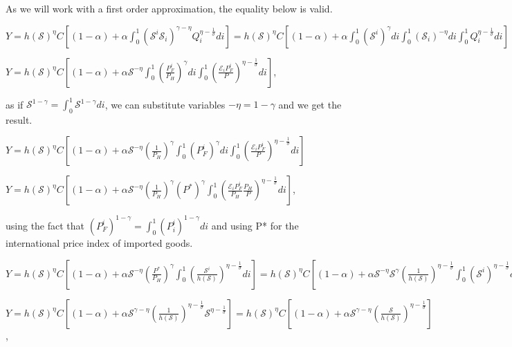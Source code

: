 \documentclass[
]{article}
\begin{document}
As we will work with a first order approximation, the equality below is
valid.

\(\displaystyle Y = h(\mathcal{S})^{\eta}C \left[ (1-\alpha) + \alpha \int_0^1 \left( \mathcal{S}^i \mathcal{S}_i \right)^{\gamma-\eta} Q_i^{\eta-\frac{1}{\sigma}} di \right] = h(\mathcal{S})^{\eta}C \left[ (1-\alpha) + \alpha \int_0^1 ( \mathcal{S}^i)^{\gamma} di \int_0^1 ( \mathcal{S}_i)^{-\eta} di \int_0^1 Q_i^{\eta-\frac{1}{\sigma}} di \right]\)

\(\displaystyle Y = h(\mathcal{S})^{\eta}C \left[ (1-\alpha) + \alpha \mathcal{S}^{-\eta} \int_0^1 \left( \frac{P_F^i}{P_H} \right)^{\gamma} di \int_0^1 \left( \frac{\mathcal{E}_i P_F^i}{P} \right)^{\eta-\frac{1}{\sigma}} di \right]\),

as if
\(\displaystyle \mathcal{S}^{1-\gamma}=\int_0^1 \mathcal{S}^{1-\gamma}di\),
we can substitute variables \(-\eta=1-\gamma\) and we get the result.

\(\displaystyle Y = h(\mathcal{S})^{\eta}C \left[ (1-\alpha) + \alpha \mathcal{S}^{-\eta} \left( \frac{1}{P_H} \right)^{\gamma} \int_0^1 \left( P_F^i \right)^{\gamma} di \int_0^1 \left( \frac{\mathcal{E}_i P_F^i}{P} \right)^{\eta-\frac{1}{\sigma}} di \right]\)

\(\displaystyle Y= h(\mathcal{S})^{\eta}C \left[ (1-\alpha) + \alpha \mathcal{S}^{-\eta} \left( \frac{1}{P_H} \right)^{\gamma} (P^*)^{\gamma} \int_0^1 \left( \frac{\mathcal{E}_i P_F^i}{P_H} \frac{P_H}{P} \right)^{\eta-\frac{1}{\sigma}} di \right]\),

using the fact that
\(\left( P_F^i \right)^{1-\gamma} = \displaystyle \int_0^1 \left( P_i^i \right)^{1-\gamma}di\)
and using P* for the international price index of imported goods.

\(\displaystyle Y = h(\mathcal{S})^{\eta}C \left[ (1-\alpha) + \alpha \mathcal{S}^{-\eta} \left( \frac{P^*}{P_H} \right)^{\gamma} \int_0^1 \left( \frac{\mathcal{S}^i}{h(\mathcal{S})} \right)^{\eta-\frac{1}{\sigma}} di \right] =h(\mathcal{S})^{\eta}C \left[ (1-\alpha) + \alpha \mathcal{S}^{-\eta} \mathcal{S}^\gamma \left( \frac{1}{h(\mathcal{S})} \right)^{\eta-\frac{1}{\sigma}} \int_0^1 ( \mathcal{S}^i )^{\eta-\frac{1}{\sigma}} di \right]\)

\(\displaystyle Y = h(\mathcal{S})^{\eta}C \left[ (1-\alpha) + \alpha \mathcal{S}^{\gamma-\eta} \left( \frac{1}{h(\mathcal{S})} \right)^{\eta-\frac{1}{\sigma}} \mathcal{S} ^{\eta-\frac{1}{\sigma}} \right] = h(\mathcal{S})^{\eta}C \left[ (1-\alpha) + \alpha \mathcal{S}^{\gamma-\eta} \left( \frac{\mathcal{S}}{h(\mathcal{S})} \right)^{\eta-\frac{1}{\sigma}} \right]\),
\end{document}
